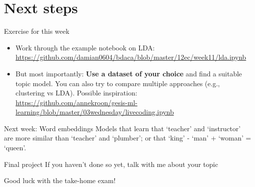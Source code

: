 \documentclass[compress]{beamer}
\begin{document}
\section{Next steps}

\begin{frame}[plain]

  \begin{block}{Exercise for this week}
    \footnotesize
  \begin{itemize}
  \item Work through the example notebook on LDA: \url{https://github.com/damian0604/bdaca/blob/master/12ec/week11/lda.ipynb}
  \item But most importantly: \textbf{Use a dataset of your choice} and find a suitable topic model. You can also try to compare multiple approaches (e.g., clustering vs LDA). Possible inspiration: \url{https://github.com/annekroon/gesis-ml-learning/blob/master/03wednesday/livecoding.ipynb}
    \end{itemize}
\end{block}

\begin{block}{Next week: Word embeddings}
Models that learn that `teacher' and `instructor' are more similar than `teacher' and `plumber'; or that `king' - `man' + `woman' = `queen'.
\end{block}


\begin{block}{Final project}
  If you haven't done so yet, talk with me about your topic
\end{block}

\end{frame}

\begin{frame}[standout]
Good luck with the take-home exam!
\end{frame}
\end{document}
